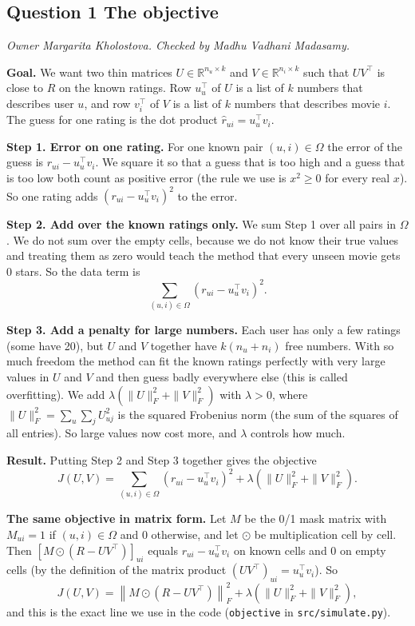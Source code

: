 \subsection*{Question 1 The objective}
\textit{Owner Margarita Kholostova. Checked by Madhu Vadhani Madasamy.}

\textbf{Goal.} We want two thin matrices $U \in \mathbb{R}^{n_u \times k}$ and $V \in \mathbb{R}^{n_i \times k}$ such that $UV^\top$ is close to $R$ on the known ratings. Row $u_u^\top$ of $U$ is a list of $k$ numbers that describes user $u$, and row $v_i^\top$ of $V$ is a list of $k$ numbers that describes movie $i$. The guess for one rating is the dot product $\hat r_{ui} = u_u^\top v_i$.

\textbf{Step 1. Error on one rating.} For one known pair $(u,i) \in \Omega$ the error of the guess is $r_{ui} - u_u^\top v_i$. We square it so that a guess that is too high and a guess that is too low both count as positive error (the rule we use is $x^2 \ge 0$ for every real $x$). So one rating adds $(r_{ui} - u_u^\top v_i)^2$ to the error.

\textbf{Step 2. Add over the known ratings only.} We sum Step 1 over all pairs in $\Omega$. We do not sum over the empty cells, because we do not know their true values and treating them as zero would teach the method that every unseen movie gets 0 stars. So the data term is
\[
\sum_{(u,i)\in\Omega} \left(r_{ui} - u_u^\top v_i\right)^2 .
\]

\textbf{Step 3. Add a penalty for large numbers.} Each user has only a few ratings (some have 20), but $U$ and $V$ together have $k(n_u + n_i)$ free numbers. With so much freedom the method can fit the known ratings perfectly with very large values in $U$ and $V$ and then guess badly everywhere else (this is called overfitting). We add $\lambda\left(\|U\|_F^2 + \|V\|_F^2\right)$ with $\lambda > 0$, where $\|U\|_F^2 = \sum_{u}\sum_{j} U_{uj}^2$ is the squared Frobenius norm (the sum of the squares of all entries). So large values now cost more, and $\lambda$ controls how much.

\textbf{Result.} Putting Step 2 and Step 3 together gives the objective
\[
J(U,V) = \sum_{(u,i)\in\Omega} \left(r_{ui} - u_u^\top v_i\right)^2 + \lambda\left(\|U\|_F^2 + \|V\|_F^2\right).
\]

\textbf{The same objective in matrix form.} Let $M$ be the 0/1 mask matrix with $M_{ui} = 1$ if $(u,i) \in \Omega$ and $0$ otherwise, and let $\odot$ be multiplication cell by cell. Then $\left[M \odot (R - UV^\top)\right]_{ui}$ equals $r_{ui} - u_u^\top v_i$ on known cells and $0$ on empty cells (by the definition of the matrix product $(UV^\top)_{ui} = u_u^\top v_i$). So
\[
J(U,V) = \left\| M \odot \left(R - UV^\top\right) \right\|_F^2 + \lambda\left(\|U\|_F^2 + \|V\|_F^2\right),
\]
and this is the exact line we use in the code (\texttt{objective} in \texttt{src/simulate.py}).

